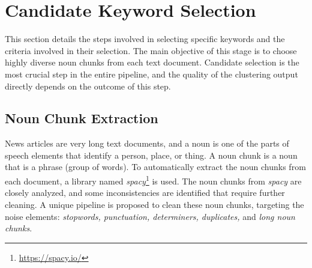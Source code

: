 \section{Candidate Keyword Selection}

This section details the steps involved in selecting specific keywords and the criteria involved
in their selection. The main objective of this stage is to choose highly diverse noun chunks from each
text document. Candidate selection is the most crucial step in the entire pipeline, and the
quality of the clustering output directly depends on the outcome of this step.

\subsection{Noun Chunk Extraction}

News articles are very long text documents, and a noun is one of the parts of speech elements that identify a person, place, or thing. A noun chunk is a noun that is a phrase (group of words). To automatically extract the noun chunks from each document, a library named \textit{spacy}\footnote{\url{https://spacy.io/}} is used. The noun chunks from \textit{spacy} are closely analyzed, and some inconsistencies are identified that require further cleaning. A unique pipeline is proposed to clean these noun chunks, targeting the noise elements: \textit{stopwords, punctuation, determiners, duplicates,} and \textit{long noun chunks}.

